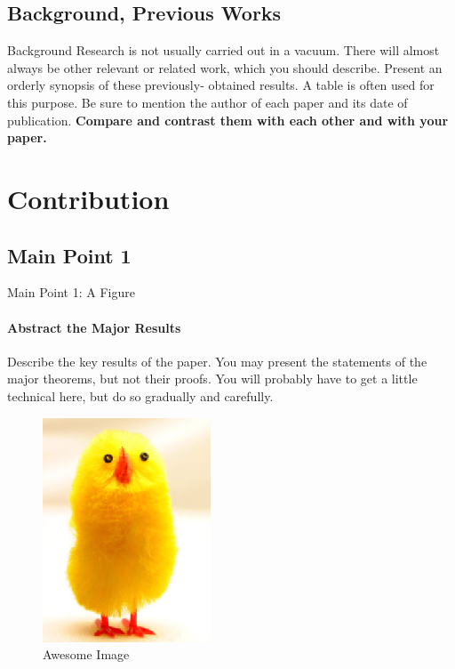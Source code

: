 \documentclass[11pt]{beamer}              %
\begin{document}

\subsection{Background, Previous Works}
\begin{frame}{Background}
Research is not usually carried out in a vacuum. There will almost always be other relevant or related work, which you should describe. Present an orderly synopsis of these previously- obtained results. A table is often used for this purpose. Be sure to mention the author of each paper and its date of publication. \textbf{Compare and contrast them with each other and with your paper.}
\end{frame}




\section{Contribution}
\subsection{Main Point 1}
\begin{frame}{Main Point 1: A Figure}
\framesubtitle{Abstract the Major Results}
Describe the key results of the paper. You may present the statements of the major theorems, but not their proofs. You will probably have to get a little technical here, but do so gradually and carefully.

\begin{figure}
    \centering
    \includegraphics[scale=0.5]{figures/Chick1.png}
    \caption{Awesome Image}
    \label{fig:awesome_image}
\end{figure}
\note{
}
\end{frame}
\end{document}
